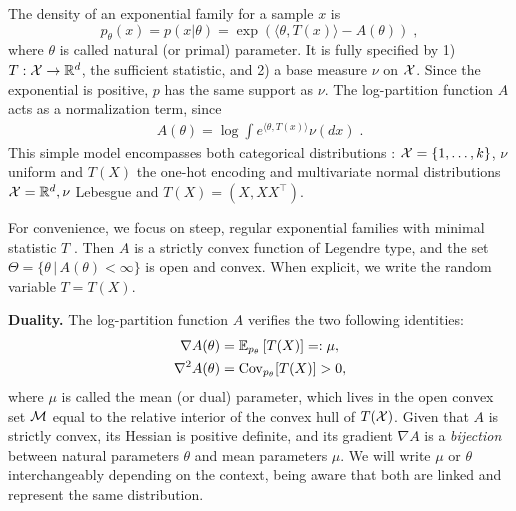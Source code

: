 \documentclass[twoside]{article}
\newcommand*{\expect}[2][]{\ensuremath{\mathbb{E}_{#1} \left[ #2 \right] }} %
\newcommand{\cond}{\,\vert\,}
\newcommand{\logpart}{A}
\newcommand{\nat}{\theta}
\newcommand{\m}{\mu}
\newcommand{\meanp}{\m}
\begin{document}
The density of an exponential family for a sample $x$ is
\begin{equation}
	 p_\nat(x) = p(x|\nat) = \exp( \langle \nat, T(x) \rangle - \logpart(\nat)) \; ,
	 \label{eq:def_expfamily}
\end{equation}
where  $\nat$ is called natural (or primal) parameter.
It is fully specified by 1) $T: {\mathcal X} \rightarrow \mathbb{R}^d$, the sufficient statistic,
and 2) a base measure $\nu$ on ${\mathcal X}$.
Since the exponential is positive, $p$ has the same support as $\nu$.
The log-partition function $\logpart$ acts as a normalization term, since
\begin{align}
    \logpart(\nat) = \log \int e^{\langle \nat, T(x) \rangle} \nu(dx) \;.
\end{align}
This simple model encompasses both categorical distributions : ${\mathcal X} = \{1, \dots, k\}$, $\nu$ uniform and $T(X)$  the one-hot encoding and multivariate normal distributions ${\mathcal X}=\mathbb{R}^d, \nu$ Lebesgue and $T(X)=(X, X X^\top)$.

For convenience, we focus on steep, regular exponential families with minimal statistic $T$ \citep{barndoffnielsen2014information}.
Then $\logpart$ is a strictly convex function of Legendre type,
and the set $\Theta = \{ \nat \cond \logpart(\nat) < \infty\}$ is open and convex.
When explicit, we write the random variable $T = T(X)$.


{\bf Duality.}
The log-partition function $\logpart$ verifies the two following identities:
\begin{align}
    \nabla\logpart(\nat) &=  \expect[p_\nat]{T(X)} =: \meanp, \label{eq:mirror-map} \\
    \nabla^2 \logpart(\nat) &= \Cov_{p_\nat}[T(X)] > 0,
\end{align}
where $\meanp$ is called the mean (or dual) parameter, which lives in the open convex set ${\mathcal M}$ equal to the relative interior of the convex hull of $T({\mathcal X})$.
Given that $\logpart$ is strictly convex, its Hessian is positive definite, and its gradient $\nabla \logpart$ is a \textit{bijection} between natural parameters $\nat$ and mean parameters $\m$.
We will write $\m$ or $\nat$ interchangeably depending on the context, being aware that both are linked and represent the same distribution.
\end{document}
